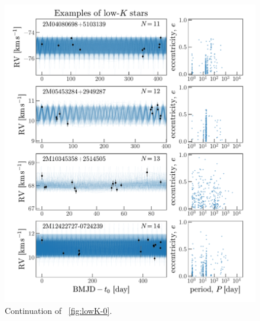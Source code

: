 \documentclass[modern, letterpaper]{aastex62}
\begin{document}
\begin{figure}[hp]
\begin{center}
\includegraphics[width=\textwidth]{lowK-1}
\end{center}
\caption{%
Continuation of \figurename~\ref{fig:lowK-0}.
\label{fig:lowK-1}
}
\end{figure}
\end{document}
